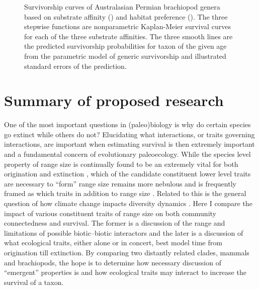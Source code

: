 \documentclass[12pt,letterpaper]{article}
\begin{document}
\begin{figure}[ht]
\begin{subfigure}[b]{0.5\textwidth}
      \label{subfig:env_surv}
    \end{subfigure}
    \caption{Survivorship curves of Australasian Permian brachiopod genera based on substrate affinity () and habitat preference (). The three stepwise functions are nonparametric Kaplan-Meier survival curves for each of the three substrate affinities. The three smooth lines are the predicted survivorship probabilities for taxon of the given age from the parametric model of generic survivorship and illustrated standard errors of the prediction.}
  \label{fig:brach_surv}
\end{figure}



\section{Summary of proposed research}
One of the most important questions in (paleo)biology is why do certain species go extinct while others do not? %
Elucidating what interactions, or traits governing interactions, are important when estimating survival is then extremely important and a fundamental concern of evolutionary paleoecology. While the species level property of range size is continually found to be an extremely vital for both origination and extinction \citep{Roy2009c,Foote2013,Jablonski2003,Jablonski1987,Harnik2013}, which of the candidate constituent lower level traits are necessary to ``form'' range size remains more nebulous and is frequently framed as which traits in addition to range size \citep{Foote2013,Harnik2011,Nurnberg2013a}. Related to this is the general question of how climate change impacts diversity dynamics \citep{Barnosky2001a,Alroy2000g,Figueirido2012,Olszewski2004}.
Here I compare the impact of various constituent traits of range size on both community connectedness and survival. The former is a discussion of the range and limitations of possible biotic--biotic interactors and the later is a discussion of what ecological traits, either alone or in concert, best model time from origination till extinction. By comparing two distantly related clades, mammals and brachiopods, the hope is to determine how necessary discussion of ``emergent'' properties is and how ecological traits may interact to increase the survival of a taxon.
\end{document}
